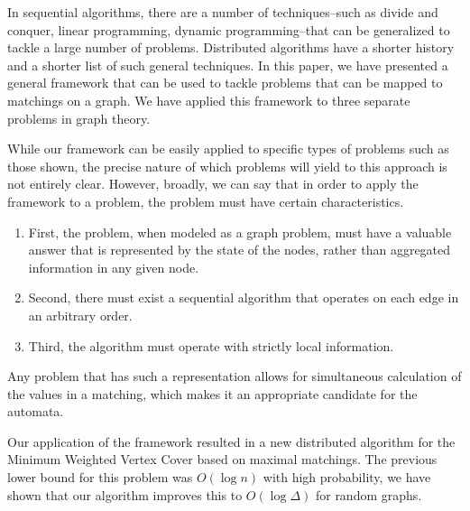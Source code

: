 In sequential algorithms, there are a number of techniques--such as divide and conquer, linear programming, dynamic programming--that can be generalized to tackle a large number of problems. Distributed algorithms have a shorter history and a shorter list of such general techniques. In this paper, we have presented a general framework that can be used to tackle problems that can be mapped to matchings on a graph. We have applied this framework to three separate problems in graph theory.

While our framework can be easily applied to specific types of problems such as those shown, the precise nature of which problems will yield to this approach is not entirely clear. However, broadly, we can say that in order to apply the framework to a problem, the problem must have certain characteristics.
\begin{enumerate}
\item First, the problem, when modeled as a graph problem, must have a valuable answer that is represented by the state of the nodes, rather than aggregated information in any given node.
\item Second, there must exist a sequential algorithm that operates on each edge in an arbitrary order. 
\item Third, the algorithm must operate with strictly local information.
\end{enumerate}
Any problem that has such a representation allows for simultaneous calculation of the values in a matching, which makes it an appropriate candidate for the automata.

Our application of the framework resulted in a new distributed algorithm for the Minimum Weighted Vertex Cover based on maximal matchings. The previous lower bound for this problem was $O(\log n)$ with high probability, we have shown that our algorithm improves this to $O(\log \Delta)$ for random graphs. 
